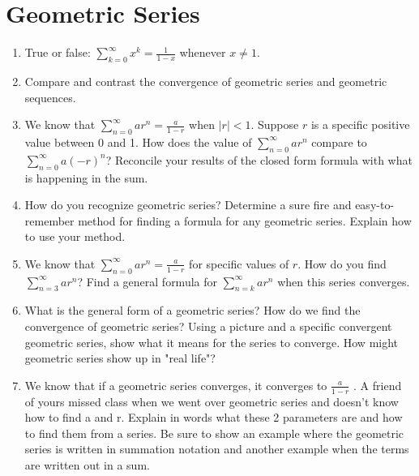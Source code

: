 \section{Geometric Series}
\begin{enumerate}

\item True or false: $
\displaystyle\sum\limits_{k = 0}^\infty  {x^k }  = \frac{1}{{1 - x}}$ whenever $x \ne 1$.

\item Compare and contrast the convergence of geometric series and geometric sequences.

\item We know that $\displaystyle\sum\limits_{n = 0}^\infty  {ar^n }  = \frac{a}{{1 - r}}$ when $\left| r \right| < 1$.  Suppose $r$ is a specific positive value between 0 and 1.  How does the value of $\displaystyle\sum\limits_{n = 0}^\infty  {ar^n }$ compare to $\displaystyle\sum\limits_{n = 0}^\infty  {a\left( { - r} \right)^n } $?  Reconcile your results of the closed form formula with what is happening in the sum.

\item How do you recognize geometric series?  Determine a sure fire and easy-to-remember method for finding a formula for any geometric series.  Explain how to use your method.

\item We know that $
\displaystyle\sum\limits_{n = 0}^\infty  {ar^n }  = \frac{a}{{1 - r}}$ for specific values of $r$.   How do you find $\displaystyle\sum\limits_{n = 3}^\infty  {ar^n } $?  Find a general formula for $\displaystyle\sum\limits_{n = k}^\infty  {ar^n } $ when this series converges.

\item What is the general form of a geometric series?  How do we find the convergence of geometric series?  Using a picture and a specific convergent geometric series, show what it means for the series to converge.  How might geometric series show up in "real life"?

\item We know that if a geometric series converges, it converges to $
\frac{a}{{1 - r}}$
.  A friend of yours missed class when we went over geometric series and doesn't know how to find a and r.  Explain in words what these 2 parameters are and how to find them from a series.  Be sure to show an example where the geometric series is written in summation notation and another example when the terms are written out in a sum.


\end{enumerate}
